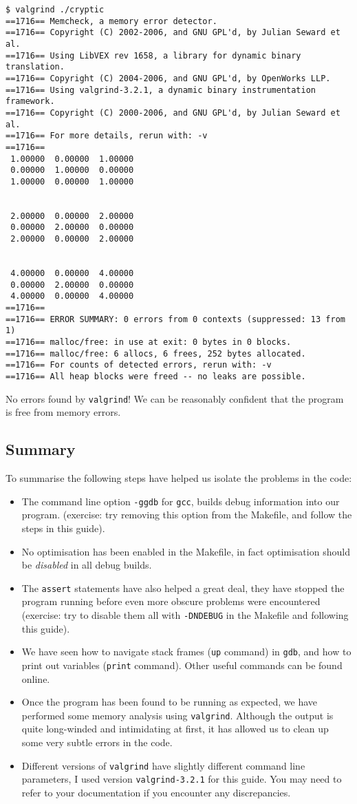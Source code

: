 \documentclass[a4paper,12pt]{article}
\begin{document}
\begin{verbatim}
$ valgrind ./cryptic
==1716== Memcheck, a memory error detector.
==1716== Copyright (C) 2002-2006, and GNU GPL'd, by Julian Seward et al.
==1716== Using LibVEX rev 1658, a library for dynamic binary translation.
==1716== Copyright (C) 2004-2006, and GNU GPL'd, by OpenWorks LLP.
==1716== Using valgrind-3.2.1, a dynamic binary instrumentation framework.
==1716== Copyright (C) 2000-2006, and GNU GPL'd, by Julian Seward et al.
==1716== For more details, rerun with: -v
==1716== 
 1.00000  0.00000  1.00000 
 0.00000  1.00000  0.00000 
 1.00000  0.00000  1.00000 


 2.00000  0.00000  2.00000 
 0.00000  2.00000  0.00000 
 2.00000  0.00000  2.00000 


 4.00000  0.00000  4.00000 
 0.00000  2.00000  0.00000 
 4.00000  0.00000  4.00000 
==1716== 
==1716== ERROR SUMMARY: 0 errors from 0 contexts (suppressed: 13 from 1)
==1716== malloc/free: in use at exit: 0 bytes in 0 blocks.
==1716== malloc/free: 6 allocs, 6 frees, 252 bytes allocated.
==1716== For counts of detected errors, rerun with: -v
==1716== All heap blocks were freed -- no leaks are possible.
\end{verbatim}
No errors found by {\tt valgrind}! We can be reasonably confident that the program is free from memory errors.

\subsection*{Summary}
To summarise the following steps have helped us isolate the problems in the code:
\begin{itemize}
\item The command line option \verb|-ggdb| for {\tt gcc}, builds debug information into our program. (exercise: try removing this option from the Makefile, and follow the steps in this guide).
\item No optimisation has been enabled in the Makefile, in fact optimisation should be \emph{disabled} in all debug builds.
\item The {\tt assert} statements have also helped a great deal, they have stopped the program running before even more obscure problems were encountered (exercise: try to disable them all with {\tt -DNDEBUG} in the Makefile and following this guide).
\item We have seen how to navigate stack frames ({\tt up} command) in {\tt gdb}, and how to print out variables ({\tt print} command). Other useful commands can be found online.
\item Once the program has been found to be running as expected, we have performed some memory analysis using {\tt valgrind}. Although the output is quite long-winded and intimidating at first, it has allowed us to clean up some very subtle errors in the code.
\item Different versions of {\tt valgrind} have slightly different command line parameters, I used version {\tt valgrind-3.2.1} for this guide. You may need to refer to your documentation if you encounter any discrepancies.
\end{itemize}
\end{document}
